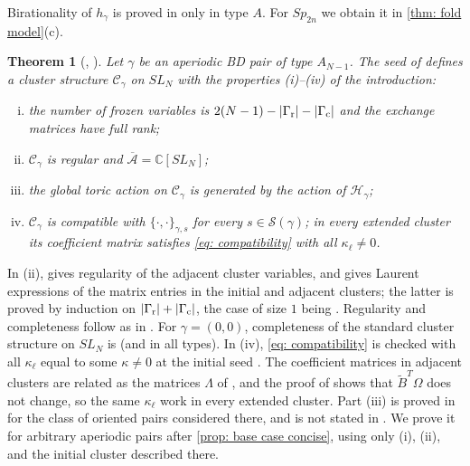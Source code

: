 \documentclass[a4paper]{amsart}
\numberwithin{equation}{section}
\newtheorem{theorem}{Theorem}[section]
\theoremstyle{definition}
\theoremstyle{remark}
\newcommand{\bbC}{\mathbb{C}}
\newcommand{\mcH}{\mathcal{H}}
\newcommand{\mcC}{\mathcal{C}}
\newcommand{\mcS}{\mathcal{S}}
\newcommand{\oA}{\overline{\mathcal{A}}}
\newcommand{\tB}{\widetilde{B}}
\newcommand{\rr}{{\rm r}}
\newcommand{\cc}{{\rm c}}
\newcommand{\Sp}{Sp_{2n}}
\begin{document}
Birationality of $h_\gamma$ is proved in \cite{GSV23} only in type $A$. For $\Sp$ we obtain it in \cref{thm: fold model}(c).

\begin{theorem}[{\cite[Theorem~3.3]{GSV19}, \cite[Theorems~4.3, 4.11, 4.14, 4.17]{GSV23}}]
  \label{thm: GSV}
  Let $\gamma$ be an aperiodic BD pair of type $A_{N-1}$.
  The seed of \cite[Theorem~4.11]{GSV23} defines a cluster structure $\mcC_\gamma$ on $SL_N$ with the properties (i)--(iv) of the introduction:
  \begin{enumerate}[(i)]
    \item the number of frozen variables is $2(N-1)-|\Gamma_{\rr}|-|\Gamma_{\cc}|$ and the exchange matrices have full rank;
    \item $\mcC_\gamma$ is regular and $\oA=\bbC[SL_N]$;
    \item the global toric action on $\mcC_\gamma$ is generated by the action of $\mcH_\gamma$;
    \item $\mcC_\gamma$ is compatible with $\{\cdot,\cdot\}_{\gamma,s}$ for every $s\in\mcS(\gamma)$; in every extended cluster its coefficient matrix satisfies \eqref{eq: compatibility} with all $\kappa_\ell\neq0$.
  \end{enumerate}
\end{theorem}

In (ii), \cite[Theorem~4.14]{GSV23} gives regularity of the adjacent cluster variables, and \cite[Theorem~4.17]{GSV23} gives Laurent expressions of the matrix entries in the initial and adjacent clusters; the latter is proved by induction on $|\Gamma_{\rr}|+|\Gamma_{\cc}|$, the case of size $1$ being \cite[Section~7.3]{GSV19}. Regularity and completeness follow as in \cite[Sections~4.4--4.5]{GSV23}.
  For $\gamma=(0,0)$, completeness of the standard cluster structure on $SL_N$ is \cite{Oya25} (and \cite[Theorem~B.1]{QY25} in all types).
In (iv), \eqref{eq: compatibility} is checked with all $\kappa_\ell$ equal to some $\kappa\neq0$ at the initial seed \cite[proof of Theorem~4.11]{GSV23}.
  The coefficient matrices in adjacent clusters are related as the matrices $\Lambda$ of \cite[(3.4)]{BZ05}, and the proof of \cite[Proposition~3.4]{BZ05} shows that $\tB^T\Omega$ does not change, so the same $\kappa_\ell$ work in every extended cluster.
Part (iii) is proved in \cite[Theorem~3.3]{GSV19} for the class of oriented pairs considered there, and is not stated in \cite{GSV23}. We prove it for arbitrary aperiodic pairs after \cref{prop: base case concise}, using only (i), (ii), and the initial cluster described there.
\end{document}
